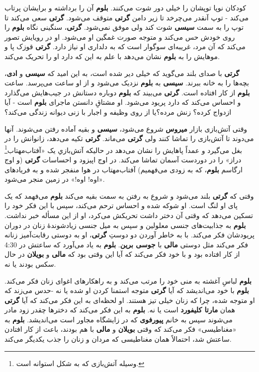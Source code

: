 \documentclass[12pt]{book}
\newcommand{\noun}[1]{{\textbf{#1}}}
\begin{document}
    کودکان نوپا توپشان را خیلی دور شوت می‌کنند. \noun{بلوم} آن را برداشته و برایشان پرتاب می‌کند - توپ آنقدر می‌چرخد تا زیر دامن \noun{گرتی} متوقف می‌شود. \noun{گرتی} سعی می‌کند تا توپ را به سمت \noun{سیسی} شوت کند ولی موفق نمی‌شود. \noun{گرتی}، سنگینی نگاه \noun{بلوم} را روی خودش حس می‌کند و متوجه صورت غمگین او می‌شود. او در رویایش تصور می‌کند که آن مرد، غریبه‌ای سوگوار است که به دلداری او نیاز دارد. \noun{گرتی} قوزک پا و موهایش را به \noun{بلوم} نشان می‌دهد با علم به این که دارد او را تحریک می‌کند.

   \noun{گرتی} با صدای بلند می‌گوید که خیلی دیر شده است، به این امید که \noun{سیسی} و \noun{ادی}، بچه‌ها را به خانه ببرند. \noun{سیسی} به \noun{بلوم} نزدیک می‌شود و از او ساعت می‌پرسد. ساعت \noun{بلوم} از کار افتاده است. \noun{گرتی} می‌بیند که \noun{بلوم} دوباره دستانش در جیب‌هایش می‌گذارد و احساس می‌کند که دارد پریود می‌شود. او مشتاقِ دانستن ماجرای \noun{بلوم} است - آیا ازدواج کرده؟ زنش مرده؟یا از روی وظیفه و اجبار با زنی دیوانه زندگی می‌کند؟

    وقتی آتش‌بازی بازار \noun{میروس} شروع می‌شود، \noun{سیسی} و بقیه آماده رفتن می‌شوند. آنها می‌دوند تا آتش‌بازی را تماشا کنند ولی \noun{گرتی} می‌ماند. \noun{گرتی} تکیه می‌دهد، زانوانش را در بغل می‌گیرد و عمداً پاهایش را نشان می‌دهد در حالیکه آتش‌بازیِ یک «آفتاب‌مهتاب\footnote{ وسیله آتش‌بازی که به شکل استوانه است.} دراز» را در دوردست آسمان تماشا می‌کند. در اوج اپیزود و احساسات \noun{گرتی} (و اوج ارگاسم \noun{بلوم}، که به زودی می‌فهمیم) آفتاب‌مهتاب در هوا منفجر شده و به فریادهای «اوه! اوه!» در زمین منجر می‌شود.

    وقتی که \noun{گرتی} بلند می‌شود و شروع به رفتن به سمت بقیه می‌کند \noun{بلوم} می‌فهمد که یک پای او لنگ است. او شوکه شده و احساس ترحم می‌کند، سپس با این فکر خود را تسکین می‌دهد که وقتی آن دختر داشت تحریکش می‌کرد، او از این مسأله خبر نداشت. \noun{بلوم} به جذابیت‌های جنسی معلولین و سپس به میل جنسی زیادشوندهٔ زنان در دوران پریودشان فکر می‌کند. با به خاطر آوردن دو دوستِ \noun{گرتی}، او به دوستی رقابت‌آمیز زنانه فکر می‌کند مثل دوستی \noun{مالی} با \noun{جوسی برین}. \noun{بلوم} به یاد می‌آورد که ساعتش در 4:30 از کار افتاده بود و با خود فکر می‌کند که آیا این وقتی بود که \noun{مالی} و \noun{بویلان} در حال سکس بودند یا نه.

    \noun{بلوم} لباسِ آغشته به منی خود را مرتب می‌کند و به راهکارهای اغوای زنان فکر می‌کند. \noun{بلوم} با خود می‌اندیشد که آیا \noun{گرتی} متوجه استمنا کردن او شده یا نه -حدس می‌زند که او متوجه شده، چرا که زنان خیلی تیز هستند. او لحظه‌ای به این فکر می‌کند که آیا \noun{گرتی} همان \noun{مارتا کلیفورد} است یا نه. \noun{بلوم} به این فکر می‌کند که دخترها چقدر زود مادر می‌شوند سپس به خانم \noun{پیورفوی} که در زایشگاه مجاور است می‌اندیشد. \noun{بلوم} به «مغناطیسی» فکر می‌کند که وقتی \noun{بویلان} و \noun{مالی} با هم بودند، باعث از کار افتادن ساعتش شد، احتمالاً همان مغناطیسی که مردان و زنان را جذب یکدیگر می‌کند.
\end{document}
